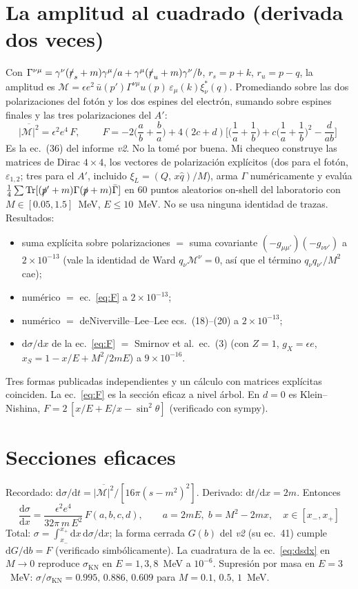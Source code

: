 \documentclass[11pt,a4paper]{article}
\newcommand{\Ap}{A'}
\newcommand{\eps}{\epsilon}
\newcommand{\KN}{\mathrm{KN}}
\newcommand{\dd}{\mathrm{d}}
\begin{document}
\section{La amplitud al cuadrado (derivada dos veces)}
Con $\Gamma^{\nu\mu}=\gamma^\nu(\slashed r_s+m)\gamma^\mu/a+\gamma^\mu(\slashed r_u+m)\gamma^\nu/b$,
$r_s=p+k$, $r_u=p-q$, la amplitud es $\mathcal M=\eps e^2\,\bar u(p')\Gamma^{\nu\mu}u(p)\,\varepsilon_\mu(k)\xi^*_\nu(q)$.
Promediando sobre las dos polarizaciones del fotón y los dos espines del electrón, sumando sobre espines finales y las
tres polarizaciones del $\Ap$:
\begin{equation}
\overline{|\mathcal M|^2}=\eps^2e^4\,F,\qquad
\boxed{\;F=-2\Big(\frac ab+\frac ba\Big)+4(2c+d)\Big[\Big(\frac1a+\frac1b\Big)+c\Big(\frac1a+\frac1b\Big)^2-\frac{d}{ab}\Big]\;}
\label{eq:F}
\end{equation}
Es la ec.~(36) del informe \emph{v2}. No la tomé por buena. Mi chequeo construye las matrices de Dirac $4\times4$, los
vectores de polarización explícitos (dos para el fotón, $\varepsilon_{1,2}$; tres para el $\Ap$, incluido
$\xi_L=(Q,\,x\hat q)/M$), arma $\Gamma$ numéricamente y evalúa
$\tfrac14\sum\mathrm{Tr}[(\slashed p'+m)\Gamma(\slashed p+m)\bar\Gamma]$ en 60 puntos aleatorios on-shell del laboratorio con
$M\in[0.05,1.5]$~MeV, $E\le10$~MeV. No se usa ninguna identidad de trazas. Resultados:
\begin{itemize}
\item suma explícita sobre polarizaciones $=$ suma covariante $(-g_{\mu\mu'})(-g_{\nu\nu'})$ a $2\times10^{-13}$ (vale la
identidad de Ward $q_\nu\mathcal M^\nu=0$, así que el término $q_\nu q_{\nu'}/M^2$ cae);
\item numérico $=$ ec.~\eqref{eq:F} a $2\times10^{-13}$;
\item numérico $=$ deNiverville--Lee--Lee ecs.~(18)--(20) a $2\times10^{-13}$;
\item $\dd\sigma/\dd x$ de la ec.~\eqref{eq:F} $=$ Smirnov et al.\ ec.~(3) (con $Z=1$, $g_X=\eps e$, $x_S=1-x/E+M^2/2mE$)
a $9\times10^{-16}$.
\end{itemize}
Tres formas publicadas independientes y un cálculo con matrices explícitas coinciden. La ec.~\eqref{eq:F} es la
sección eficaz a nivel árbol. En $d=0$ es Klein--Nishina, $F=2\,[x/E+E/x-\sin^2\theta]$ (verificado con sympy).

\section{Secciones eficaces}
Recordado: $\dd\sigma/\dd t=\overline{|\mathcal M|^2}/[16\pi(s-m^2)^2]$. Derivado: $\dd t/\dd x=2m$. Entonces
\begin{equation}
\boxed{\;\frac{\dd\sigma}{\dd x}=\frac{\eps^2e^4}{32\pi\,m\,E^2}\,F(a,b,c,d),\qquad a=2mE,\; b=M^2-2mx,\quad x\in[x_-,x_+]\;}
\label{eq:dsdx}
\end{equation}
Total: $\sigma=\int_{x_-}^{x_+}\dd x\,\dd\sigma/\dd x$; la forma cerrada $G(b)$ del \emph{v2} (su ec.~41) cumple
$\dd G/\dd b=F$ (verificado simbólicamente). La cuadratura de la ec.~\eqref{eq:dsdx} en $M\to0$ reproduce $\sigma_\KN$ en
$E=1,3,8$~MeV a $10^{-6}$. Supresión por masa en $E=3$~MeV:
$\sigma/\sigma_\KN=0.995,\,0.886,\,0.609$ para $M=0.1,\,0.5,\,1$~MeV.
\end{document}
